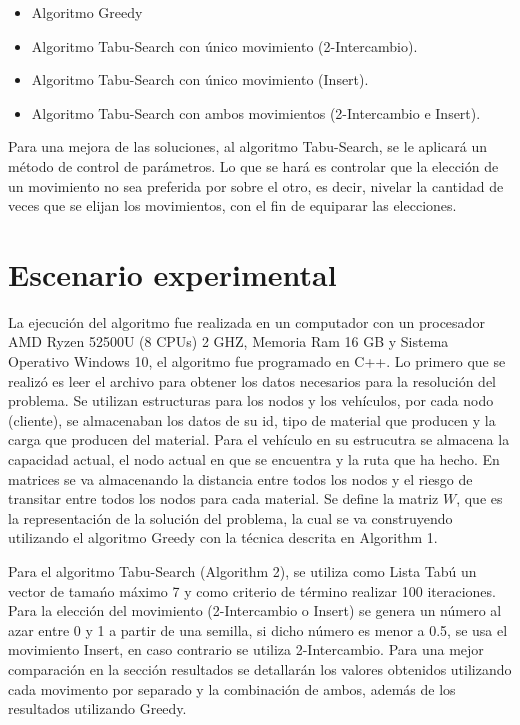 \documentclass[conference]{IEEEtran}
\begin{document}
\begin{itemize}
    \item Algoritmo Greedy
    \item Algoritmo Tabu-Search con \'unico movimiento (2-Intercambio).
    \item Algoritmo Tabu-Search con \'unico movimiento (Insert).
    \item Algoritmo Tabu-Search con ambos movimientos (2-Intercambio e Insert).
\end{itemize}

Para una mejora de las soluciones, al algoritmo Tabu-Search, se le aplicar\'a un m\'etodo de control de par\'ametros. Lo que se har\'a es controlar que la elecci\'on de un movimiento no sea preferida por sobre el otro, es decir, nivelar la cantidad de veces que se elijan los movimientos, con el fin de equiparar las elecciones.


\section{Escenario experimental}

La ejecuci\'on del algoritmo fue realizada en un computador con un procesador AMD Ryzen 52500U (8 CPUs) 2 GHZ, Memoria Ram 16 GB y Sistema Operativo Windows 10, el algoritmo fue programado en C++. Lo primero que se realiz\'o es leer el archivo para obtener los datos necesarios para la resoluci\'on del problema. Se utilizan estructuras para los nodos y los veh\'iculos, por cada nodo (cliente), se almacenaban los datos de su id, tipo de material que producen y la carga que producen del material. Para el veh\'iculo en su estrucutra se almacena la capacidad actual, el nodo actual en que se encuentra y la ruta que ha hecho. En matrices se va almacenando la distancia entre todos los nodos y el riesgo de transitar entre todos los nodos para cada material. Se define la matriz $W$, que es la representaci\'on de la soluci\'on del problema, la cual se va construyendo utilizando el algoritmo Greedy con la t\'ecnica descrita en Algorithm 1. 

Para el algoritmo Tabu-Search (Algorithm 2), se utiliza como Lista Tab\'u un vector de tama\'no m\'aximo 7 y como criterio de t\'ermino realizar 100 iteraciones. Para la elecci\'on del movimiento (2-Intercambio o Insert) se genera un n\'umero al azar entre 0 y 1 a partir de  una semilla, si dicho n\'umero es menor a 0.5, se usa el movimiento Insert, en caso contrario se utiliza 2-Intercambio. Para una mejor comparaci\'on en la secci\'on resultados se detallar\'an los valores obtenidos utilizando cada movimento por separado y la combinaci\'on de ambos, adem\'as de los resultados utilizando Greedy.
\end{document}
